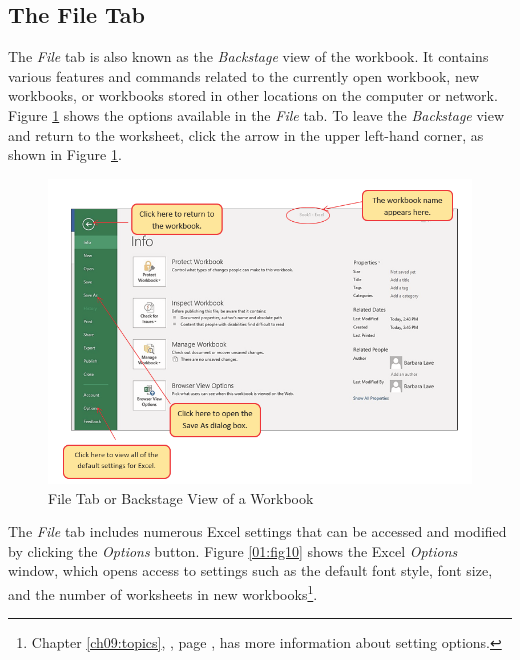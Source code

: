 \subsection{The File Tab}

The \textit{File} tab is also known as the \textit{Backstage} view of the workbook. It contains various features and commands related to the currently open workbook, new workbooks, or workbooks stored in other locations on the computer or network. Figure \ref{01:fig09} shows the options available in the \textit{File} tab. To leave the \textit{Backstage} view and return to the worksheet, click the arrow in the upper left-hand corner, as shown in Figure \ref{01:fig09}.

\begin{figure}[H]
	\centering
	\includegraphics[width=\maxwidth{.95\linewidth}]{gfx/ch01_fig09}
	\caption{File Tab or Backstage View of a Workbook}
	\label{01:fig09}
\end{figure}

The \textit{File} tab includes numerous Excel settings that can be accessed and modified by clicking the \textit{Options} button. Figure \ref{01:fig10} shows the Excel \textit{Options} window, which opens access to settings such as the default font style, font size, and the number of worksheets in new workbooks\footnote{Chapter \ref{ch09:topics}, , page \pageref{ch09:topics}, has more information about setting options.}.


